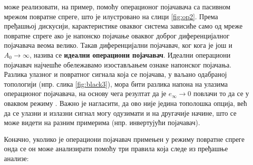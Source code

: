 може реализовати, на пример, помоћу операционог појачавача 
са пасивном мрежом повратне спреге, што је илустровано на слици 
\ref{fig:op2}. Према пређашњој дискусији, карактеристике оваквог 
система зависиће само од мреже повратне спреге ако је напонско 
појачање оваквог доброг диференцијалног појачавача веома велико. 
Такав диференцијални појачавач, 
ког кога је још и $A_0 \to \infty$, назива се \textbf{идеални 
операциони појачавач}. Идеални операциони појачавач најчешће 
обележавамо изостављањем ознаке 
напонског
појачања. Разлика улазног и повратног сигнала која се 
појачава, у ваљано одабраној топологији
(нпр. слика \ref{fig:black3}), 
мора бити разлика напона на улазима операционог појачавача, на основу чега
резултат да је $e_{\infty} \to 0$ повлачи 
то да се у оваквом режиму . Важно је нагласити, да ово није једина 
тополошка опција, већ да се улазни и излазни сигнал могу 
одузимати и на другачије начине, што се може видети на разним 
примерима (нпр. инвертујући појачавач). 
%
%

%
Коначно, уколико је операциони појачавач примењен у режиму 
повратне спреге онда се он може анализирати помоћу три правила која следе из пређашње анализе: \\


